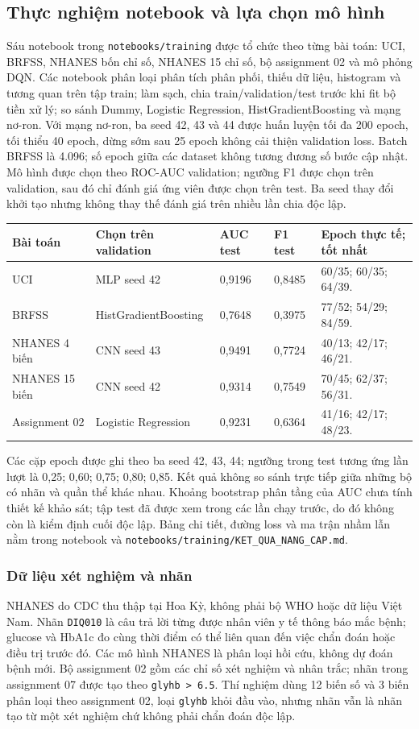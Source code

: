 \subsection{Thực nghiệm notebook và lựa chọn mô hình}
Sáu notebook trong \texttt{notebooks/training} được tổ chức theo từng bài toán: UCI, BRFSS, NHANES bốn chỉ số, NHANES 15 chỉ số, bộ assignment 02 và mô phỏng DQN. Các notebook phân loại phân tích phân phối, thiếu dữ liệu, histogram và tương quan trên tập train; làm sạch, chia train/validation/test trước khi fit bộ tiền xử lý; so sánh Dummy, Logistic Regression, HistGradientBoosting và mạng nơ-ron. Với mạng nơ-ron, ba seed 42, 43 và 44 được huấn luyện tối đa 200 epoch, tối thiểu 40 epoch, dừng sớm sau 25 epoch không cải thiện validation loss. Batch BRFSS là 4.096; số epoch giữa các dataset không tương đương số bước cập nhật. Mô hình được chọn theo ROC-AUC validation; ngưỡng F1 được chọn trên validation, sau đó chỉ đánh giá ứng viên được chọn trên test. Ba seed thay đổi khởi tạo nhưng không thay thế đánh giá trên nhiều lần chia độc lập.

\begin{longtable}{p{2.8cm}p{3.6cm}p{1.7cm}p{1.5cm}p{3.8cm}}\toprule
\textbf{Bài toán} & \textbf{Chọn trên validation} & \textbf{AUC test} & \textbf{F1 test} & \textbf{Epoch thực tế; tốt nhất}\\\midrule\endhead
UCI & MLP seed 42 & 0,9196 & 0,8485 & 60/35; 60/35; 64/39.\\
BRFSS & HistGradientBoosting & 0,7648 & 0,3975 & 77/52; 54/29; 84/59.\\
NHANES 4 biến & CNN seed 43 & 0,9491 & 0,7724 & 40/13; 42/17; 46/21.\\
NHANES 15 biến & CNN seed 42 & 0,9314 & 0,7549 & 70/45; 62/37; 56/31.\\
Assignment 02 & Logistic Regression & 0,9231 & 0,6364 & 41/16; 42/17; 48/23.\\\bottomrule\end{longtable}
Các cặp epoch được ghi theo ba seed 42, 43, 44; ngưỡng trong test tương ứng lần lượt là 0,25; 0,60; 0,75; 0,80; 0,85. Kết quả không so sánh trực tiếp giữa những bộ có nhãn và quần thể khác nhau. Khoảng bootstrap phân tầng của AUC chưa tính thiết kế khảo sát; tập test đã được xem trong các lần chạy trước, do đó không còn là kiểm định cuối độc lập. Bảng chi tiết, đường loss và ma trận nhầm lẫn nằm trong notebook và \texttt{notebooks/training/KET\_QUA\_NANG\_CAP.md}.

\subsubsection{Dữ liệu xét nghiệm và nhãn}
NHANES do CDC thu thập tại Hoa Kỳ, không phải bộ WHO hoặc dữ liệu Việt Nam. Nhãn \texttt{DIQ010} là câu trả lời từng được nhân viên y tế thông báo mắc bệnh; glucose và HbA1c đo cùng thời điểm có thể liên quan đến việc chẩn đoán hoặc điều trị trước đó. Các mô hình NHANES là phân loại hồi cứu, không dự đoán bệnh mới. Bộ assignment 02 gồm các chỉ số xét nghiệm và nhân trắc; nhãn trong assignment 07 được tạo theo \texttt{glyhb > 6.5}. Thí nghiệm dùng 12 biến số và 3 biến phân loại theo assignment 02, loại \texttt{glyhb} khỏi đầu vào, nhưng nhãn vẫn là nhãn tạo từ một xét nghiệm chứ không phải chẩn đoán độc lập.


